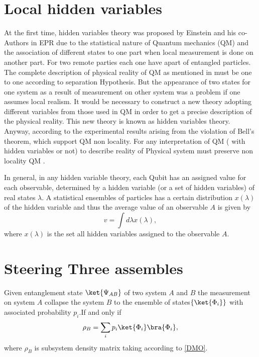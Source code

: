 \section{Local hidden variables}

At the first time, hidden variables theory was proposed by Einstein and his co-Authors in EPR \citep{EPR} due to the statistical nature of Quantum mechanics (QM) and the association of different states to one part when local measurement is done on another part. For two remote parties each one have apart of entangled particles. The complete description of physical reality of QM as mentioned in \citep{EPR} must be one to one according to separation Hypothesis. But the appearance of two states for one system as a result of measurement on other system was a problem if one assumes local realism. It would be necessary to construct a new theory adopting different variables from those used in QM in order to get a precise description of the physical reality. This new theory is known as hidden variables theory. Anyway, according to the experimental results arising from the violation of Bell's theorem, which support QM non locality. For any interpretation of QM ( with hidden variables or not) to describe reality of Physical system must preserve non locality QM \cite{PhysRev.85.166}.

In general, in any hidden variable theory, each Qubit has an assigned value for each observable, determined by a hidden variable (or a set of hidden variables) of real
states $\lambda$. A statistical ensembles of particles has a certain distribution $x(\lambda)$ of the hidden variable and thus the average value of an observable $A$ is given by
\begin{equation}
v=\int d \lambda x(\lambda),
\end{equation}
where $x(\lambda)$ is the set all hidden variables assigned to the observable $A$.


\section{Steering Three assembles }

\begin{theorem}
Given entanglement state $\ket{\Psi_{AB}}$ of two system $A$ and $B$ the measurement on system $A$ collapse the system $B$ to the ensemble of states$\{\ket{\Phi_i}\}$ with associated probability $p_i$.If and only if 
\begin{equation}
\rho_B=\sum_i p_i \ket{\Phi_i} \bra{\Phi_i},
\end{equation}
where $\rho_B$ is subsystem density matrix taking according to \ref{DMO}.
\end{theorem}






